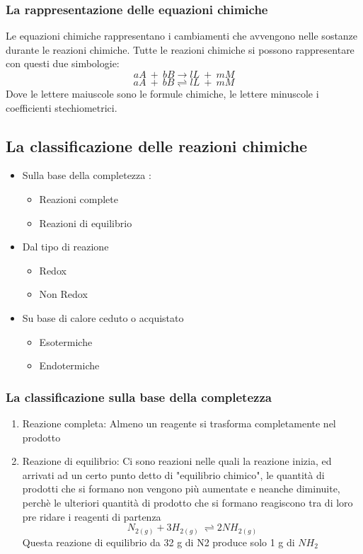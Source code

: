 \documentclass{article}
\begin{document}
\subsubsection{La rappresentazione delle equazioni chimiche}
Le equazioni chimiche rappresentano i cambiamenti che avvengono nelle sostanze durante le reazioni chimiche. 
Tutte le reazioni chimiche si possono rappresentare con questi due simbologie:
\[aA \ + \ bB \rightarrow lL \ + \ mM\]
\[aA \ + \ bB \rightleftharpoons lL \ + \ mM\]
Dove le lettere maiuscole sono le formule chimiche, le lettere minuscole i coefficienti stechiometrici.
\subsection{La classificazione delle reazioni chimiche}
\begin{itemize}
    \item Sulla base della completezza :  
    \begin{itemize}
        \item Reazioni complete
        \item Reazioni di equilibrio
    \end{itemize}
    \item Dal tipo di reazione 
    \begin{itemize}
        \item Redox
        \item Non Redox
    \end{itemize}
    \item Su base di calore ceduto o acquistato
    \begin{itemize}
        \item Esotermiche
        \item Endotermiche
    \end{itemize}
\end{itemize}
\subsubsection{La classificazione sulla base della completezza}
\begin{enumerate}
    \item Reazione completa: Almeno un reagente si trasforma completamente nel prodotto
    
    \item Reazione di equilibrio: Ci sono reazioni nelle quali la reazione inizia, ed arrivati ad un certo punto detto di "equilibrio chimico",
    le quantità di prodotti che si formano non vengono più aumentate e neanche
    diminuite, perchè le ulteriori quantità di prodotto che si formano reagiscono tra di loro pre ridare i reagenti di partenza
    \[N_{2(g)}+3H_{2(g)}\ \rightleftharpoons 2NH_{2(g)}\]
    Questa reazione di equilibrio da 32 g di N2 produce solo 1 g di $NH_2$\\

\end{enumerate}
\end{document}
